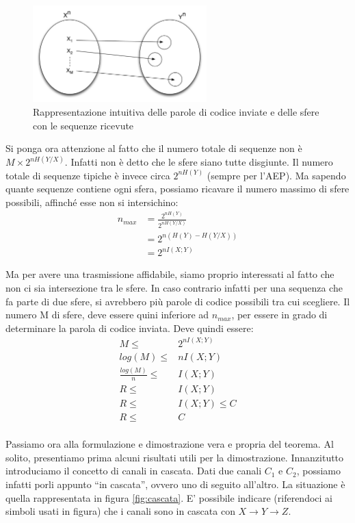 \begin{figure}[htbp]
\begin{center}
	\includegraphics[width=0.6\textwidth]{img/sha2.pdf}
\caption{Rappresentazione intuitiva delle parole di codice inviate e delle sfere con le sequenze ricevute}
\label{fig:sha2}
\end{center}
\end{figure}

Si ponga ora attenzione al fatto che il numero totale di sequenze non è $M \times 2^{n H(Y/X)}$. Infatti non è detto che
le sfere siano tutte disgiunte. Il numero totale di sequenze tipiche è invece circa $2^{n H(Y)}$ (sempre per l'AEP). 
Ma sapendo quante sequenze contiene ogni sfera, possiamo ricavare il numero massimo di sfere possibili, affinché esse non si intersichino:
\[\begin{split}
 n_{max}&=\frac{2^{n H(Y)}}{2^{n H(Y/X)}} \\
    &=2^{n (H(Y)-H(Y/X))} \\
    &=2^{n I(X;Y) }
  \end{split}
\]

Ma per avere una trasmissione affidabile, siamo proprio interessati al fatto che non ci sia intersezione tra le sfere. In caso contrario infatti per una sequenza che fa parte di due sfere, si avrebbero più parole di codice possibili tra cui scegliere. Il numero M di sfere, deve essere quini inferiore ad $n_{max}$, per essere in grado di determinare la parola 
di codice inviata.
Deve quindi essere:
\[\begin{split}
 M \le & 2^{n I(X;Y)} \\
  log(M) \le & n I(X;Y) \\
 \frac{log(M)}{n} \le & I(X;Y) \\
 R \le & I(X;Y) \\
 R \le & I(X;Y) \le C \\
 R \le & C \\
  \end{split}
\]

\bigskip

Passiamo ora alla formulazione e dimostrazione vera e propria del teorema. Al solito, presentiamo prima alcuni risultati utili per la dimostrazione. Innanzitutto introduciamo il concetto di canali in cascata. Dati due canali $C_1$ e $C_2$, possiamo infatti porli appunto ``in cascata'', ovvero uno di seguito all'altro. La situazione è quella rappresentata in figura \ref{fig:cascata}. E' possibile indicare (riferendoci ai simboli usati in figura) che i canali sono in cascata con $X \to Y \to Z$.

